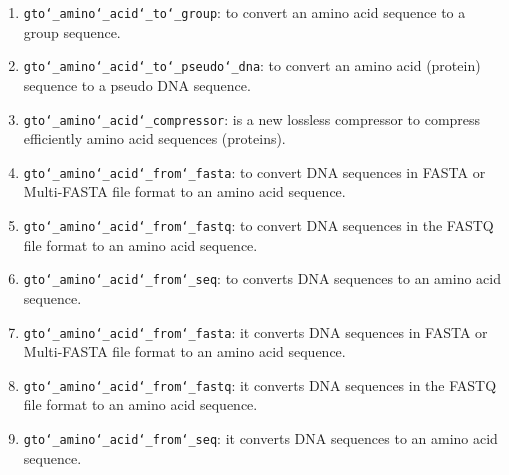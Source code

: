 \begin{enumerate}
	
\item \texttt{gto\char`_amino\char`_acid\char`_to\char`_group}: to convert an amino acid sequence to a group sequence.

\item \texttt{gto\char`_amino\char`_acid\char`_to\char`_pseudo\char`_dna}: to convert an amino acid (protein) sequence to a pseudo DNA sequence.

\item \texttt{gto\char`_amino\char`_acid\char`_compressor}: is a new lossless compressor to compress efficiently amino acid sequences (proteins).

\item \texttt{gto\char`_amino\char`_acid\char`_from\char`_fasta}: to convert DNA sequences in FASTA or Multi-FASTA file format to an amino acid sequence.

\item \texttt{gto\char`_amino\char`_acid\char`_from\char`_fastq}: to convert DNA sequences in the FASTQ file format to an amino acid sequence.

\item \texttt{gto\char`_amino\char`_acid\char`_from\char`_seq}: to converts DNA sequences to an amino acid sequence.


\item \texttt{gto\char`_amino\char`_acid\char`_from\char`_fasta}: it converts DNA sequences in FASTA or Multi-FASTA file format to an amino acid sequence.

\item \texttt{gto\char`_amino\char`_acid\char`_from\char`_fastq}: it converts DNA sequences in the FASTQ file format to an amino acid sequence.

\item \texttt{gto\char`_amino\char`_acid\char`_from\char`_seq}: it converts DNA sequences to an amino acid sequence.


\end{enumerate}







%

